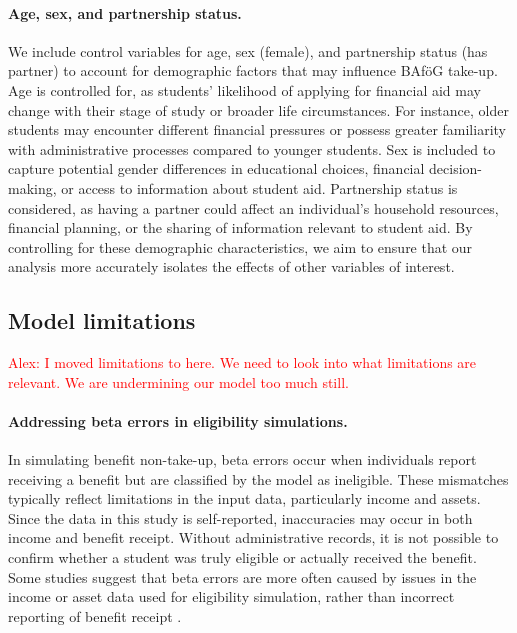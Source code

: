 \paragraph{Age, sex, and partnership status.}
We include control variables for age, sex (female), and partnership status (has partner) to account for demographic factors that may influence BAföG take-up. 
Age is controlled for, as students’ likelihood of applying for financial aid may change with their stage of study or broader life circumstances. 
For instance, older students may encounter different financial pressures or possess greater familiarity with administrative processes compared to younger students.
Sex is included to capture potential gender differences in educational choices, financial decision-making, or access to information about student aid. 
Partnership status is considered, as having a partner could affect an individual’s household resources, financial planning, or the sharing of information relevant to student aid. 
By controlling for these demographic characteristics, we aim to ensure that our analysis more accurately isolates the effects of other variables of interest.



\subsection{Model limitations}
\label{subsection:model_limitations}

\textcolor{red}{Alex: I moved limitations to here. We need to look into what limitations are relevant. We are undermining our model too much still.}

\paragraph{Addressing beta errors in eligibility simulations.}
In simulating benefit non-take-up, beta errors occur when individuals report receiving a benefit but are classified by the model as ineligible. 
These mismatches typically reflect limitations in the input data, particularly income and assets.
Since the data in this study is self-reported, inaccuracies may occur in both income and benefit receipt.
Without administrative records, it is not possible to confirm whether a student was truly eligible or actually received the benefit. 
Some studies suggest that beta errors are more often caused by issues in the income or asset data used for eligibility simulation, rather than incorrect reporting of benefit receipt \citep{frick_claim_2007, janssens_takemod_2022}. 

